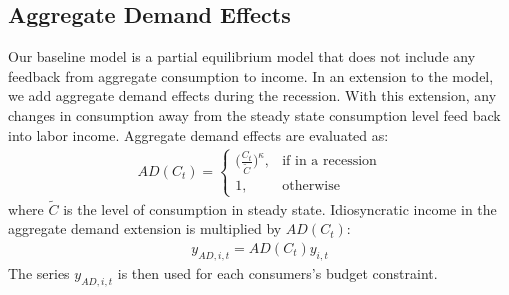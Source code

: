 \documentclass[../HAFiscal]{subfiles}
\begin{document}
	\subsection{Aggregate Demand Effects}
	\label{sec:ADeffects}
	
	Our baseline model is a partial equilibrium model that does not include any feedback from aggregate consumption to income. In an extension to the model, we add aggregate demand effects during the recession. With this extension, any changes in consumption away from the steady state consumption level feed back into labor income. Aggregate demand effects are evaluated as:
	\begin{align}
	AD(C_t) =   \begin{cases}
				\Big(\frac{C_t}{\tilde{C}}\Big)^\kappa, & \text{if in a recession} \\
				1, & \text{otherwise} 
				\end{cases}
	\end{align}
	where $\tilde{C}$ is the level of consumption in steady state. Idiosyncratic income in the aggregate demand extension is multiplied by $AD(C_t)$:
	\begin{align}
	y_{AD,i,t} = AD(C_t)y_{i,t}
	\end{align}
	The series $y_{AD,i,t}$ is then used for each consumers's budget constraint.
\end{document}
